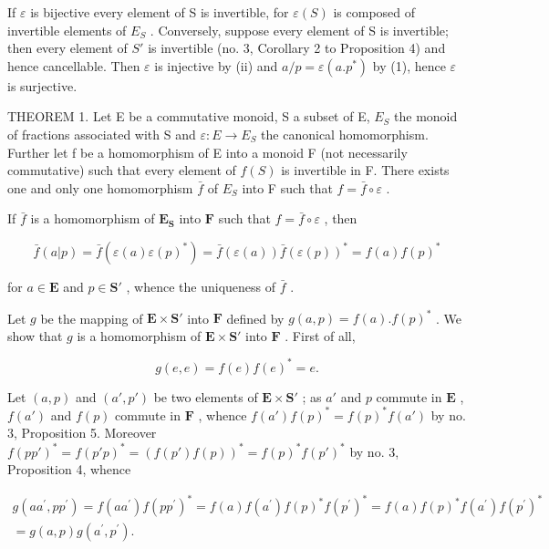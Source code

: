 If \(\varepsilon\) is bijective every element of S is invertible, for \(\varepsilon(S)\) is composed of invertible elements of \(E_{S}\) . Conversely, suppose every element of S is invertible; then every element of \(S'\) is invertible (no. 3, Corollary 2 to Proposition 4) and hence cancellable. Then \(\varepsilon\) is injective by (ii) and \(a/p = \varepsilon(a.p^{*})\) by (1), hence \(\varepsilon\) is surjective.

THEOREM 1. Let E be a commutative monoid, S a subset of E, \(E_{S}\) the monoid of fractions associated with S and \(\varepsilon: E \to E_{S}\) the canonical homomorphism. Further let f be a homomorphism of E into a monoid F (not necessarily commutative) such that every element of \(f(S)\) is invertible in F. There exists one and only one homomorphism \(\bar{f}\) of \(E_{S}\) into F such that \(f = \bar{f} \circ \varepsilon\) .

If \(\bar{f}\) is a homomorphism of \(\mathbf{E}_{\mathbf{S}}\) into \(\mathbf{F}\) such that \(f = \bar{f} \circ \varepsilon\) , then

\[
\bar {f} (a | p) = \bar {f} (\varepsilon (a) \varepsilon (p) ^ {*}) = \bar {f} (\varepsilon (a)) \bar {f} (\varepsilon (p)) ^ {*} = f (a) f (p) ^ {*}
\]

for \(a \in \mathbf{E}\) and \(p \in \mathbf{S}'\) , whence the uniqueness of \(\bar{f}\) .

Let \(g\) be the mapping of \(\mathbf{E} \times \mathbf{S}'\) into \(\mathbf{F}\) defined by \(g(a, p) = f(a).f(p)^*\) . We show that \(g\) is a homomorphism of \(\mathbf{E} \times \mathbf{S}'\) into \(\mathbf{F}\) . First of all,

\[
g (e, e) = f (e) f (e) ^ {*} = e.
\]

Let \((a, p)\) and \((a', p')\) be two elements of \(\mathbf{E} \times \mathbf{S}'\) ; as \(a'\) and \(p\) commute in \(\mathbf{E}\) , \(f(a')\) and \(f(p)\) commute in \(\mathbf{F}\) , whence \(f(a')f(p)^* = f(p)^*f(a')\) by no. 3, Proposition 5. Moreover \(f(p p')^* = f(p' p)^* = (f(p')f(p))^* = f(p)^*f(p')^*\) by no. 3, Proposition 4, whence

\[
\begin{array}{l} g (a a ^ {\prime}, p p ^ {\prime}) = f (a a ^ {\prime}) f (p p ^ {\prime}) ^ {*} = f (a) f (a ^ {\prime}) f (p) ^ {*} f (p ^ {\prime}) ^ {*} = f (a) f (p) ^ {*} f (a ^ {\prime}) f (p ^ {\prime}) ^ {*} \\ = g (a, p) g (a ^ {\prime}, p ^ {\prime}). \end{array}
\]

